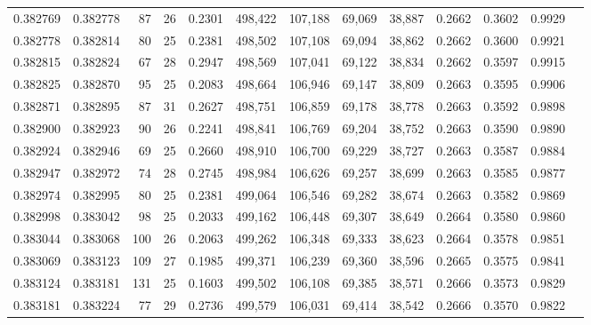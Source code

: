 \begin{tabular}{rrrrrrrrrrrrr}
0.382769 & 0.382778 &    87 &  26 &                                     0.2301 & 498,422 & 107,188 &  69,069 &  38,887 & 0.2662 & 0.3602 & 0.9929 \\
0.382778 & 0.382814 &    80 &  25 &                                     0.2381 & 498,502 & 107,108 &  69,094 &  38,862 & 0.2662 & 0.3600 & 0.9921 \\
0.382815 & 0.382824 &    67 &  28 &                                     0.2947 & 498,569 & 107,041 &  69,122 &  38,834 & 0.2662 & 0.3597 & 0.9915 \\
0.382825 & 0.382870 &    95 &  25 &                                     0.2083 & 498,664 & 106,946 &  69,147 &  38,809 & 0.2663 & 0.3595 & 0.9906 \\
0.382871 & 0.382895 &    87 &  31 &                                     0.2627 & 498,751 & 106,859 &  69,178 &  38,778 & 0.2663 & 0.3592 & 0.9898 \\
0.382900 & 0.382923 &    90 &  26 &                                     0.2241 & 498,841 & 106,769 &  69,204 &  38,752 & 0.2663 & 0.3590 & 0.9890 \\
0.382924 & 0.382946 &    69 &  25 &                                     0.2660 & 498,910 & 106,700 &  69,229 &  38,727 & 0.2663 & 0.3587 & 0.9884 \\
0.382947 & 0.382972 &    74 &  28 &                                     0.2745 & 498,984 & 106,626 &  69,257 &  38,699 & 0.2663 & 0.3585 & 0.9877 \\
0.382974 & 0.382995 &    80 &  25 &                                     0.2381 & 499,064 & 106,546 &  69,282 &  38,674 & 0.2663 & 0.3582 & 0.9869 \\
0.382998 & 0.383042 &    98 &  25 &                                     0.2033 & 499,162 & 106,448 &  69,307 &  38,649 & 0.2664 & 0.3580 & 0.9860 \\
0.383044 & 0.383068 &   100 &  26 &                                     0.2063 & 499,262 & 106,348 &  69,333 &  38,623 & 0.2664 & 0.3578 & 0.9851 \\
0.383069 & 0.383123 &   109 &  27 &                                     0.1985 & 499,371 & 106,239 &  69,360 &  38,596 & 0.2665 & 0.3575 & 0.9841 \\
0.383124 & 0.383181 &   131 &  25 &                                     0.1603 & 499,502 & 106,108 &  69,385 &  38,571 & 0.2666 & 0.3573 & 0.9829 \\
0.383181 & 0.383224 &    77 &  29 &                                     0.2736 & 499,579 & 106,031 &  69,414 &  38,542 & 0.2666 & 0.3570 & 0.9822 \\

\end{tabular}
